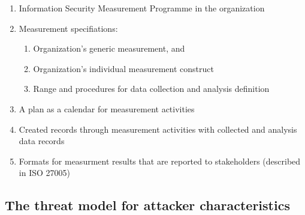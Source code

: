 \begin{enumerate}[label=(\alph*)]
  \begin{enumerate}
    \item Information Security Measurement Programme in the organization
    \item Measurement specifiations:
      \begin{enumerate}
        \item Organization's generic measurement, and
        \item Organization's individual measurement construct
        \item Range and procedures for data collection and analysis definition
      \end{enumerate}
      \item A plan as a calendar for measurement activities
      \item Created records through measurement activities with collected and analysis data records
      \item Formats for measurment results that are reported to stakeholders (described in ISO 27005)
  \end{enumerate}
\end{enumerate}

\subsection{The threat model for attacker characteristics}
\label{sec:threat}

